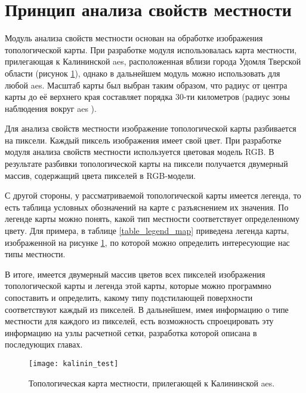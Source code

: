 \section{Принцип анализа свойств местности}

Модуль анализа свойств местности основан на обработке изображения топологической карты. При разработке модуля 
использовалась карта местности, прилегающая к Калининской \ac{aes}, расположенная вблизи города Удомля Тверской области
(рисунок \ref{fig_kalinin_map}), однако в дальнейшем модуль можно использовать для любой \ac{aes}. Масштаб карты был 
выбран таким образом, что радиус от центра карты до её верхнего края составляет порядка 30-ти километров (радиус зоны 
наблюдения вокруг \ac{aes} \cite{aes_security}).

Для анализа свойств местности изображение топологической карты разбивается на пиксели. Каждый пиксель изображения имеет 
свой цвет. При разработке модуля анализа свойств местности используется цветовая модель RGB. В результате разбивки 
топологической карты на пиксели получается двумерный массив, содержащий цвета пикселей в RGB-модели. 

С другой стороны, у рассматриваемой топологической карты имеется легенда, то есть таблица условных обозначений на карте 
с разъяснением их значения. По легенде карты можно понять, какой тип местности соответствует определенному цвету. Для 
примера, в таблице \ref{table_legend_map} приведена легенда карты, изображенной на рисунке \ref{fig_kalinin_map}, по 
которой можно определить интересующие нас типы местности.

В итоге, имеется двумерный массив цветов всех пикселей изображения топологической карты и легенда этой карты, 
которые можно программно сопоставить и определить, какому типу подстилающей поверхности соответствуют каждый из пикселей. 
В дальнейшем, имея информацию о типе местности для каждого из пикселей, есть возможность спроецировать эту информацию на 
узлы расчетной сетки, разработка которой описана в последующих главах.

\begin{figure}[ht]
\centering
	\texttt{[image: kalinin\_test]}
	\captionsetup{justification=centering}
    \caption{Топологическая карта местности, прилегающей к Калининской \ac{aes}.}
    \label{fig_kalinin_map}
\end{figure}

